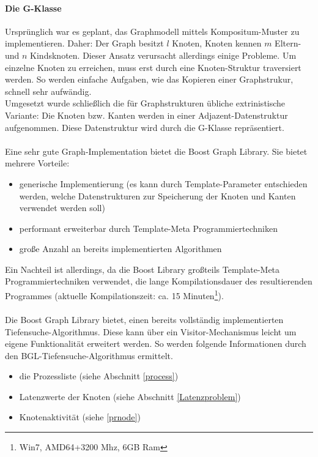 \paragraph{\label{g}Die G-Klasse}
Ursprünglich war es geplant, das Graphmodell mittels Kompositum-Muster zu implementieren. 
Daher: Der Graph besitzt $l$ Knoten, Knoten kennen $m$ Eltern- und $n$ Kindsknoten.
Dieser Ansatz verursacht allerdings einige Probleme. Um einzelne Knoten zu erreichen, muss erst durch eine Knoten-Struktur traversiert werden. So werden einfache Aufgaben, wie das Kopieren einer Graphstrukur, schnell sehr aufwändig. \\
Umgesetzt wurde schließlich die für Graphstrukturen übliche extrinistische Variante: Die Knoten bzw. Kanten werden in einer Adjazent-Datenstruktur aufgenommen. Diese Datenstruktur wird durch die G-Klasse repräsentiert. 
\\\\
Eine sehr gute Graph-Implementation bietet die Boost Graph Library.
Sie bietet mehrere Vorteile: 
\begin{itemize}
	\item generische Implementierung (es kann durch Template-Parameter entschieden werden, welche Datenstrukturen zur Speicherung der Knoten und Kanten verwendet werden soll)
	\item performant erweiterbar durch Template-Meta Programmiertechniken 
	\item große Anzahl an bereits implementierten Algorithmen 
\end{itemize}
Ein Nachteil ist allerdings, da die Boost Library großteils Template-Meta Programmiertechniken verwendet, die lange Kompilationsdauer des resultierenden Programmes (aktuelle Kompilationszeit: ca. 15 Minuten\footnote{Win7, AMD64+3200 Mhz, 6GB Ram}).
\\\\
Die Boost Graph Library bietet, einen bereits vollständig implementierten Tiefensuche-Algorithmus. 
Diese kann über ein Visitor-Mechanismus leicht um eigene Funktionalität erweitert werden. So werden folgende Informationen durch den BGL-Tiefensuche-Algorithmus ermittelt. 
\begin{itemize}
		\item die Prozessliste (siehe Abschnitt \ref{process})
		\item Latenzwerte der Knoten (siehe Abschnitt \ref{Latenzproblem})
		\item Knotenaktivität (siehe \ref{prnode})	
\end{itemize}

